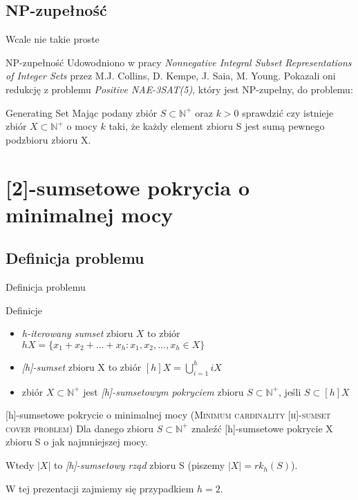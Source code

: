 \documentclass{beamer}
\newcommand{\N}{\mathbb{N}}
\begin{document}
	\subsection{NP-zupełność}
		\begin{frame}{Wcale nie takie proste}
            \begin{block}{NP-zupełność}
                Udowodniono w pracy \emph{Nonnegative Integral Subset Representations of Integer Sets} przez M.J. Collins, D. Kempe, J. Saia, M. Young.
                Pokazali oni redukcję z problemu \emph{Positive NAE-3SAT(5)}, który jest NP-zupełny, do problemu:
            \end{block}
            \begin{alertblock}{Generating Set}
                Mając podany zbiór $ S \subset \N^{+} $ oraz $ k > 0 $ sprawdzić czy istnieje zbiór $ X \subset \N^{+} $ o mocy $ k $ taki, że każdy element zbioru S jest sumą pewnego podzbioru zbioru X.
            \end{alertblock}
		\end{frame}
		
\section{[2]-sumsetowe pokrycia o minimalnej mocy}
	\subsection{Definicja problemu}
		\begin{frame}{Definicja problemu}
			\begin{block}{Definicje}
				\begin{itemize}
					\item \emph{h-iterowany sumset} zbioru $ X $ to zbiór $ hX = \lbrace x_1 + x_2 + ... + x_h : x_1,x_2,...,x_h \in X \rbrace $
					\item \emph{[h]-sumset} zbioru X to zbiór $ [h]X = \bigcup_{i=1}^{h} iX $
					\item zbiór $ X \subset \N^{+} $ jest \emph{[h]-sumsetowym pokryciem} zbioru $ S \subset \N^{+} $, jeśli $ S \subset [h]X $
				\end{itemize}
			\end{block}
			
			\pause
			\begin{alertblock}{[h]-sumsetowe pokrycie o minimalnej mocy (\rmfamily \textsc{Minimum cardinality [h]-sumset cover problem})}
				Dla danego zbioru $ S \subset \N^{+} $ znaleźć [h]-sumsetowe pokrycie X zbioru S o jak najmniejszej mocy.
				
				Wtedy $ |X| $ to \emph{[h]-sumsetowy rząd} zbioru S (piszemy $ |X| = rk_{h}(S) $).
			\end{alertblock}
			
			\pause
			W tej prezentacji zajmiemy się przypadkiem $ h=2 $.
		\end{frame}
		
\end{document}
